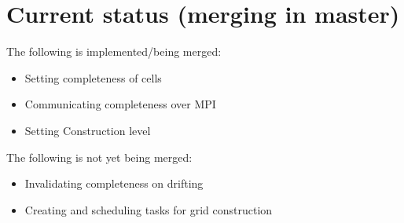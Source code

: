 \section{Current status (merging in master)}
The following is implemented/being merged:
\begin{itemize}
    \item Setting completeness of cells 
    \item Communicating completeness over MPI
    \item Setting Construction level
\end{itemize}
The following is not yet being merged:
\begin{itemize}
    \item Invalidating completeness on drifting
    \item Creating and scheduling tasks for grid construction
\end{itemize}